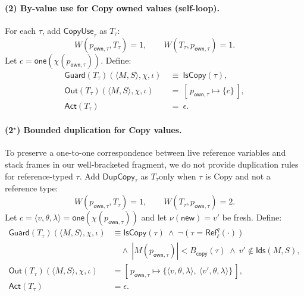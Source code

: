 \documentclass[runningheads]{llncs}
\begin{document}
\paragraph{(2) By-value use for Copy owned values (self-loop).}
For each $\tau$, add $\mathsf{CopyUse}_\tau$ as $T_{\tau}$:
\begin{equation*}
    W(p_{\mathsf{own},\tau},T_\tau)=1,\qquad
    W(T_\tau,p_{\mathsf{own},\tau})=1.
\end{equation*}
Let $c=\mathsf{one}(\chi(p_{\mathsf{own},\tau}))$. Define:
\begin{align*}
\mathsf{Guard}(T_\tau)(\langle M,S\rangle,\chi,\iota)
&~\equiv~ \mathsf{IsCopy}(\tau),\\
\mathsf{Out}(T_\tau)(\langle M,S\rangle,\chi,\iota)
&~=~ [\,p_{\mathsf{own},\tau}\mapsto \{c\}\,],\\
\mathsf{Act}(T_\tau)
&~=~ \epsilon.
\end{align*}

\paragraph{(2$^{\star}$) Bounded duplication for Copy values.}
To preserve a one-to-one correspondence between live reference variables and stack frames in our well-bracketed fragment,
we do not provide duplication rules for reference-typed $\tau$.
Add $\mathsf{DupCopy}_\tau$ as $T_\tau$only when $\tau$ is Copy and not a reference type:
\begin{equation*}
    W(p_{\mathsf{own},\tau},T_\tau)=1,\qquad
    W(T_\tau,p_{\mathsf{own},\tau})=2.
\end{equation*}
Let $c=\langle v,\theta,\lambda\rangle=\mathsf{one}(\chi(p_{\mathsf{own},\tau}))$ and let $\nu(\mathsf{new})=v'$ be fresh.
Define:
\begin{align*}
\mathsf{Guard}(T_\tau)(\langle M,S\rangle,\chi,\iota)
&\equiv \mathsf{IsCopy}(\tau)\ \wedge\ \neg(\tau=\mathsf{Ref}^{q}_{\ell}(\cdot))\\
&\quad \wedge\ |M(p_{\mathsf{own},\tau})| < B_{\mathsf{copy}}(\tau)\ \wedge\ v'\notin \mathsf{Ids}(M,S),\\
\mathsf{Out}(T_\tau)(\langle M,S\rangle,\chi,\iota)
&= [\,p_{\mathsf{own},\tau}\mapsto \{\langle v,\theta,\lambda\rangle,\ \langle v',\theta,\lambda\rangle\}\,],\\
\mathsf{Act}(T_\tau)
&= \epsilon.
\end{align*}
\end{document}
